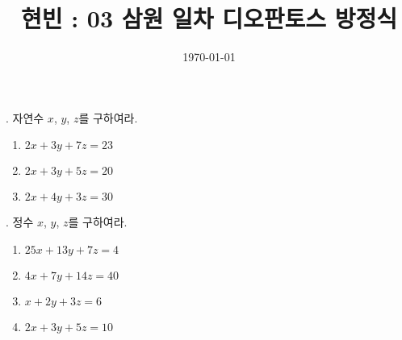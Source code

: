 \documentclass{article}
\begin{document}
\title{현빈 : 03 삼원 일차 디오판토스 방정식}
\author{}
\date{\today}
\maketitle

. 자연수 \(x\), \(y\), \(z\)를 구하여라.
\begin{enumerate}[(1)]
\item
\(2x+3y+7z=23\)
\item
\(2x+3y+5z=20\)
\item
\(2x+4y+3z=30\)
\end{enumerate}

. 정수 \(x\), \(y\), \(z\)를 구하여라.
\begin{enumerate}[(1)]
\item
\(25x+13y+7z=4\)
\item
\(4x+7y+14z=40\)
\item
\(x+2y+3z=6\)
\item
\(2x+3y+5z=10\)
\end{enumerate}
\end{document}
